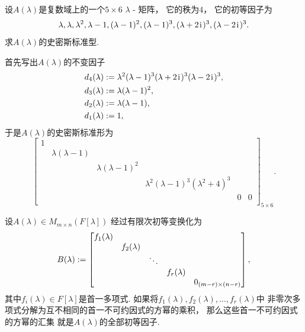 \begin{example}
设\(A(\lambda)\)是复数域上的一个\(5\times6\) \(\lambda\) - 矩阵，
它的秩为\(4\)，
它的初等因子为\begin{equation*}
	\lambda,
	\lambda,
	\lambda^2,
	\lambda-1,
	(\lambda-1)^2,
	(\lambda-1)^3,
	(\lambda+2\kern1pt\mathrm{i}\kern1pt)^3,
	(\lambda-2\kern1pt\mathrm{i}\kern1pt)^3.
\end{equation*}
求\(A(\lambda)\)的史密斯标准型.
\begin{solution}
首先写出\(A(\lambda)\)的不变因子\begin{align*}
	d_4(\lambda)
	&:=
	\lambda^2(\lambda-1)^3(\lambda+2\kern1pt\mathrm{i}\kern1pt)^3(\lambda-2\kern1pt\mathrm{i}\kern1pt)^3, \\
	d_3(\lambda)
	&:=
	\lambda(\lambda-1)^2, \\
	d_2(\lambda)
	&:=
	\lambda(\lambda-1), \\
	d_1(\lambda)
	&:=
	1,
\end{align*}
于是\(A(\lambda)\)的史密斯标准形为\begin{equation*}
	\begin{bmatrix}
		1 \\
		& \lambda (\lambda - 1) \\
		&& \lambda (\lambda - 1)^2 \\
		&&& \lambda^2 (\lambda-1)^3 (\lambda^2+4)^3 \\
		&&&& 0 & 0 \\
	\end{bmatrix}_{5\times6}.
\end{equation*}
\end{solution}
\end{example}

\begin{theorem}
设\(A(\lambda) \in M_{m \times n}(F[\lambda])\)
经过有限次初等变换化为\begin{equation*}
	B(\lambda) := \begin{bmatrix}
		f_1(\lambda) \\
		& f_2(\lambda) \\
		&& \ddots \\
		&&& f_r(\lambda) \\
		&&&& 0_{(m-r)\times(n-r)} \\
	\end{bmatrix},
\end{equation*}
其中\(f_i(\lambda) \in F[\lambda]\)是首一多项式.
如果将\(f_1(\lambda),f_2(\lambda),\dotsc,f_r(\lambda)\)中
非零次多项式分解为互不相同的首一不可约因式的方幂的乘积，
那么这些首一不可约因式的方幂的汇集
就是\(A(\lambda)\)的全部初等因子.
\end{theorem}

